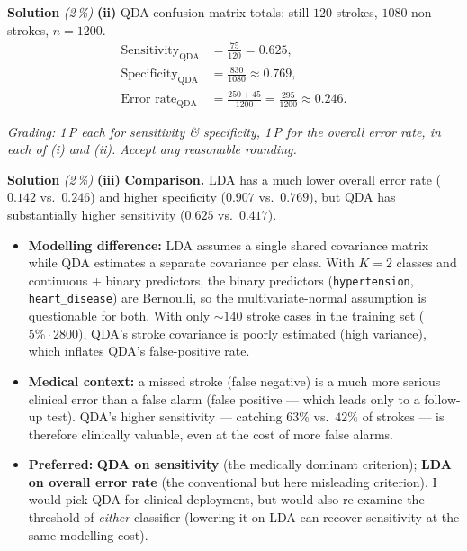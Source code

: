 \documentclass[11pt,a4paper]{article}
\newcommand{\subpoints}[1]{\textit{(#1\,\%)}}
\newcommand{\sol}{\noindent\textbf{Solution}}
\begin{document}
\medskip
\sol{} \subpoints{2} \textbf{(ii)} QDA confusion matrix totals: still $120$ strokes, $1080$
non-strokes, $n=1200$.
\begin{align*}
\text{Sensitivity}_{\mathrm{QDA}} &= \frac{75}{120} = \boxed{0.625}, \\
\text{Specificity}_{\mathrm{QDA}} &= \frac{830}{1080} \approx \boxed{0.769}, \\
\text{Error rate}_{\mathrm{QDA}} &= \frac{250+45}{1200} = \frac{295}{1200} \approx \boxed{0.246}.
\end{align*}

\noindent\emph{Grading: 1\,P each for sensitivity \& specificity, 1\,P for the overall error rate,
in each of (i) and (ii). Accept any reasonable rounding.}

\medskip
\sol{} \subpoints{2} \textbf{(iii)} \textbf{Comparison.} LDA has a much lower overall error rate
($0.142$ vs.\ $0.246$) and higher specificity ($0.907$ vs.\ $0.769$), but QDA has substantially
higher sensitivity ($0.625$ vs.\ $0.417$).
\begin{itemize}
  \item \textbf{Modelling difference:} LDA assumes a single shared covariance matrix while QDA
        estimates a separate covariance per class. With $K=2$ classes and continuous + binary
        predictors, the binary predictors (\texttt{hypertension}, \texttt{heart\_disease}) are
        Bernoulli, so the multivariate-normal assumption is questionable for both. With only
        $\sim 140$ stroke cases in the training set ($5\%\cdot 2800$), QDA's stroke covariance
        is poorly estimated (high variance), which inflates QDA's false-positive rate.
  \item \textbf{Medical context:} a missed stroke (false negative) is a much more serious clinical
        error than a false alarm (false positive --- which leads only to a follow-up test).
        QDA's higher sensitivity --- catching $63\%$ vs.\ $42\%$ of strokes --- is therefore
        clinically valuable, even at the cost of more false alarms.
  \item \textbf{Preferred:} \textbf{QDA on sensitivity} (the medically dominant criterion);
        \textbf{LDA on overall error rate} (the conventional but here misleading criterion). I
        would pick QDA for clinical deployment, but would also re-examine the threshold of
        \emph{either} classifier (lowering it on LDA can recover sensitivity at the same
        modelling cost).
\end{itemize}
\end{document}
